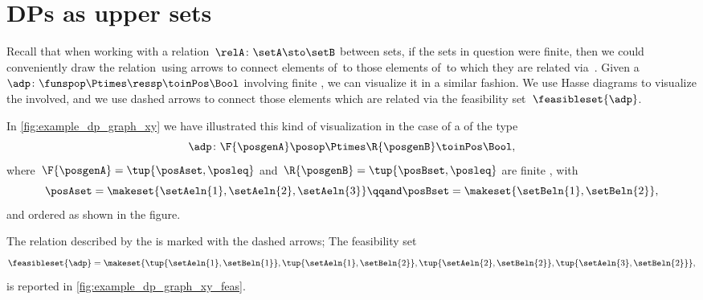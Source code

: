 


\section{DPs as upper sets}



Recall that when working with a relation~$\relA \colon \setA \sto \setB$ between sets, if the sets in question were finite, then we could conveniently draw the relation~\relA using arrows to connect elements of~\setA to those elements of~\setB to which they are related via~\relA.
Given a ~$\adp \colon \funspop \Ptimes \ressp\toinPos \Bool$ involving finite , we can visualize it in a similar fashion.
We use Hasse diagrams to visualize the  involved, and we use dashed arrows to connect those elements which are related via the feasibility set~$\feasibleset{\adp}$.

\begin{marginfigure}
    \centering
    \caption{}
    \label{fig:example_dp_graph_xy}
\end{marginfigure}
\begin{marginfigure}
    \centering
    \caption{}
    \label{fig:example_dp_graph_xy_feas}
\end{marginfigure}

\begin{example}
    \label{exa:visualize-dp}
    In \cref{fig:example_dp_graph_xy} we have illustrated this kind of visualization in the case of a  of the type
    \begin{equation}
        \adp \colon \F{\posgenA} \posop \Ptimes \R{\posgenB} \toinPos \Bool,
    \end{equation}
    where~$\F{\posgenA} = \tup{\posAset, \posleq}$ and~$ \R{\posgenB} = \tup{\posBset, \posleq}$ are finite , with
    \begin{equation}
        \posAset = \makeset{ \setAeln{1}, \setAeln{2}, \setAeln{3} }
        \qqand
        \posBset = \makeset{ \setBeln{1}, \setBeln{2}},
    \end{equation}
    and ordered as shown in the figure.

    The relation described by the  is marked with the dashed arrows;
    The feasibility set
    \begin{equation}
        \feasibleset{\adp} = \makeset{\tup{\setAeln{1}, \setBeln{1}}, \tup{\setAeln{1}, \setBeln{2}}, \tup{\setAeln{2}, \setBeln{2}}, \tup{\setAeln{3}, \setBeln{2}} },
    \end{equation}
    is reported in \cref{fig:example_dp_graph_xy_feas}.
\end{example}




